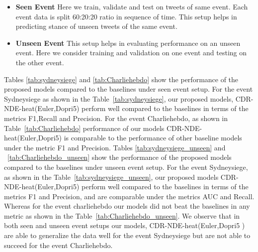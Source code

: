\documentclass{article} %
\begin{document}
   \begin{itemize}
       \item \textbf{Seen Event} Here we train, validate and test on tweets of same event. Each
event data is split 60:20:20 ratio in sequence of time. This setup helps in
predicting stance of unseen tweets of the same event.
\item \textbf{Unseen Event} This setup helps in evaluating performance on an unseen event. Here we consider training and validation on
    one event and testing on the other event. 
   \end{itemize} 


Tables \ref{tab:sydneysiege} and \ref{tab:Charliehebdo} show the performance of the proposed models compared to the baselines under seen event setup. For the event Sydneysiege as shown in the Table~\ref{tab:sydneysiege}, our proposed models, CDR-NDE-heat(Euler,Dopri5) perform well compared to the baselines in terms of the metrics F1,Recall and Precision. For the event Charliehebdo, as shown in Table~\ref{tab:Charliehebdo} performance of our models CDR-NDE-heat(Euler,Dopri5) is comparable to the performance of other baseline models under the metric F1 and Precision. 
Tables \ref{tab:sydneysiege_unseen} and ~\ref{tab:Charliehebdo_unseen} show the performance of the proposed models compared to the baselines under unseen event setup. For the event Sydneysiege, as shown in the Table~\ref{tab:sydneysiege_unseen}, our proposed models CDR-NDE-heat(Euler,Dopri5) perform well compared to the baselines in terms of the metrics F1 and Precision, and are comparable under the metrics AUC and Recall.  Whereas for the event charliehebdo our models did not beat the baselines in any metric as shown in the Table~\ref{tab:Charliehebdo_unseen}. We observe that in both seen and unseen event setups our models, CDR-NDE-heat(Euler,Dopri5 ) are able to generalize the data well for the event Sydneysiege but are not able to succeed for the event Charliehebdo. %
\end{document}
